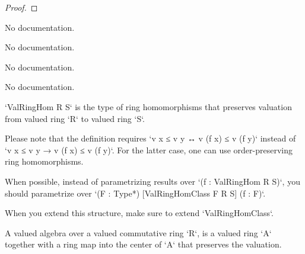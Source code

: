 \begin{proof}
    \leanok
\end{proof}

\begin{theorem}\label{LocalRing.maximalIdeal_eq_jacobson_of_bot}
                No documentation.
    \end{theorem}

\begin{theorem}\label{unique_of_valuation_extension}
                No documentation.
    \end{theorem}

\begin{definition}\label{toValAlgEquiv}
                No documentation.
    \end{definition}

\begin{definition}\label{Ideal.quotientAlgebra'}
        \leanok
                No documentation.
    \end{definition}

\begin{definition}\label{ValRingHom}
        \leanok
                `ValRingHom R S` is the type of ring homomorphisms that preserves valuation from valued ring `R` to valued ring `S`.

Please note that the definition requires `v x ≤ v y ↔ v (f x) ≤ v (f y)` instead of `v x ≤ v y → v (f x) ≤ v (f y)`. For the latter case, one can use order-preserving ring homomorphisms.

When possible, instead of parametrizing results over `(f : ValRingHom R S)`,
you should parametrize over `(F : Type*) [ValRingHomClass F R S] (f : F)`.

When you extend this structure, make sure to extend `ValRingHomClass`.
    \end{definition}

\begin{definition}\label{ValAlgebra}
        \leanok
                A valued algebra over a valued commutative ring `R`, is a valued ring `A` together with a ring map into the center of `A` that preserves the valuation.
    \end{definition}

